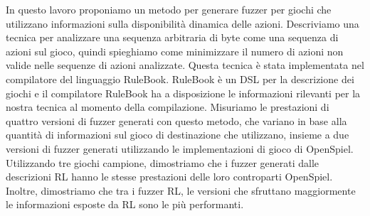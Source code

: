 \documentclass{Configuration_Files/PoliMi3i_thesis}
\begin{document}
In questo lavoro proponiamo un metodo per generare fuzzer per giochi che utilizzano informazioni sulla disponibilità dinamica delle azioni.
Descriviamo una tecnica per analizzare una sequenza arbitraria di byte come una sequenza di azioni sul gioco, quindi spieghiamo come minimizzare il numero di azioni non valide nelle sequenze di azioni analizzate.
Questa tecnica è stata implementata nel compilatore del linguaggio RuleBook. RuleBook è un DSL per la descrizione dei giochi e il compilatore RuleBook ha a disposizione le informazioni rilevanti per la nostra tecnica al momento della compilazione.
Misuriamo le prestazioni di quattro versioni di fuzzer generati con questo metodo, che variano in base alla quantità di informazioni sul gioco di destinazione che utilizzano, insieme a due versioni di fuzzer generati utilizzando le implementazioni di gioco di OpenSpiel.
Utilizzando tre giochi campione, dimostriamo che i fuzzer generati dalle descrizioni RL hanno le stesse prestazioni delle loro controparti OpenSpiel.
Inoltre, dimostriamo che tra i fuzzer RL, le versioni che sfruttano maggiormente le informazioni esposte da RL sono le più performanti.
\\
\\

\thispagestyle{empty}
\tableofcontents %
\thispagestyle{empty}
\cleardoublepage

%
%
%    
%
\end{document}
